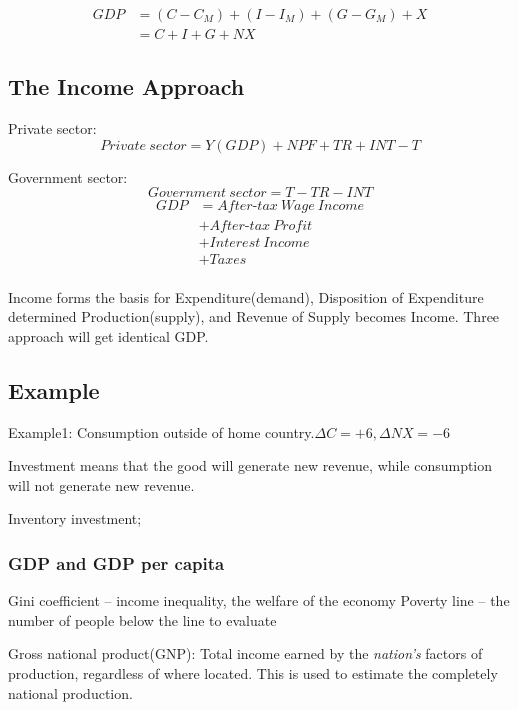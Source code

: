 \documentclass[10pt, a4paper]{article}
\begin{document}
                \begin{align*}
                    GDP &= (C - C_M) + (I - I_M) + (G - G_M) + X \\
                    &= C + I + G + NX
                \end{align*}

        \subsection{The Income Approach}
            Private sector: 
            $$Private\ sector = Y(GDP) + NPF + TR + INT - T$$

            Government sector: 
            $$Government\ sector = T - TR - INT$$
            \begin{align*}
                GDP &= After\text{-}tax\ Wage\ Income \\
                    &+ After\text{-}tax\ Profit \\
                    &+ Interest\ Income\\
                    &+ Taxes\\
            \end{align*}

            Income forms the basis for Expenditure(demand), Disposition of Expenditure determined Production(supply), and Revenue of Supply becomes Income. Three approach will get identical GDP.
        \subsection{Example}
            Example1: Consumption outside of home country.$\Delta C = +6, \Delta NX = -6$
            
            Investment means that the good will generate new revenue, while consumption will not generate new revenue. 

            Inventory investment;
        \subsubsection{GDP and GDP per capita}
            Gini coefficient -- income inequality, the welfare of the economy
            Poverty line -- the number of people below the line to evaluate

            Gross national product(GNP): Total income earned by the \emph{nation's} factors of production, regardless of where located. This is used to estimate the completely national production.
\end{document}
